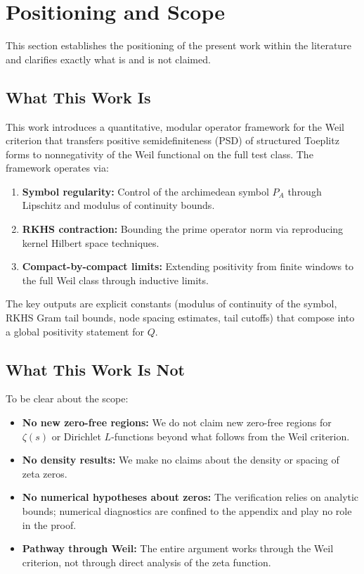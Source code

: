 
\section{Positioning and Scope}\label{sec:scope}

This section establishes the positioning of the present work within the literature and clarifies exactly what is and is not claimed.

\subsection{What This Work Is}

This work introduces a quantitative, modular operator framework for the Weil criterion that transfers positive semidefiniteness (PSD) of structured Toeplitz forms to nonnegativity of the Weil functional on the full test class. The framework operates via:

\begin{enumerate}
  \item \textbf{Symbol regularity:} Control of the archimedean symbol $P_A$ through Lipschitz and modulus of continuity bounds.

  \item \textbf{RKHS contraction:} Bounding the prime operator norm via reproducing kernel Hilbert space techniques.

  \item \textbf{Compact-by-compact limits:} Extending positivity from finite windows to the full Weil class through inductive limits.
\end{enumerate}

The key outputs are explicit constants (modulus of continuity of the symbol, RKHS Gram tail bounds, node spacing estimates, tail cutoffs) that compose into a global positivity statement for $Q$.

\subsection{What This Work Is Not}

To be clear about the scope:

\begin{itemize}
  \item \textbf{No new zero-free regions:} We do not claim new zero-free regions for $\zeta(s)$ or Dirichlet $L$-functions beyond what follows from the Weil criterion.

  \item \textbf{No density results:} We make no claims about the density or spacing of zeta zeros.

  \item \textbf{No numerical hypotheses about zeros:} The verification relies on analytic bounds; numerical diagnostics are confined to the appendix and play no role in the proof.

  \item \textbf{Pathway through Weil:} The entire argument works through the Weil criterion, not through direct analysis of the zeta function.
\end{itemize}

